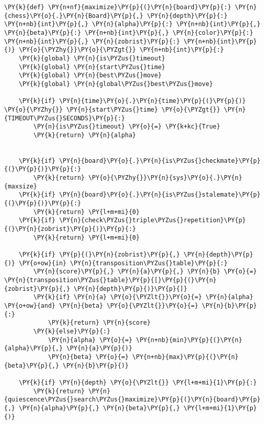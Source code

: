     \begin{tcolorbox}[fontupper=\linespread{.66}\selectfont, breakable, size=fbox, boxrule=1pt, pad at break*=1mm,colback=cellbackground, colframe=cellborder]
\begin{Verbatim}[commandchars=\\\{\}]
\PY{k}{def} \PY{n+nf}{maximize}\PY{p}{(}\PY{n}{board}\PY{p}{:} \PY{n}{chess}\PY{o}{.}\PY{n}{Board}\PY{p}{,} \PY{n}{depth}\PY{p}{:} \PY{n+nb}{int}\PY{p}{,} \PY{n}{alpha}\PY{p}{:} \PY{n+nb}{int}\PY{p}{,} \PY{n}{beta}\PY{p}{:} \PY{n+nb}{int}\PY{p}{,} \PY{n}{color}\PY{p}{:} \PY{n+nb}{int}\PY{p}{,} \PY{n}{zobrist}\PY{p}{:} \PY{n+nb}{int}\PY{p}{)} \PY{o}{\PYZhy{}}\PY{o}{\PYZgt{}} \PY{n+nb}{int}\PY{p}{:}
    \PY{k}{global} \PY{n}{is\PYZus{}timeout}
    \PY{k}{global} \PY{n}{start\PYZus{}time}
    \PY{k}{global} \PY{n}{best\PYZus{}move}
    \PY{k}{global} \PY{n}{global\PYZus{}best\PYZus{}move}

    \PY{k}{if} \PY{n}{time}\PY{o}{.}\PY{n}{time}\PY{p}{(}\PY{p}{)} \PY{o}{\PYZhy{}} \PY{n}{start\PYZus{}time} \PY{o}{\PYZgt{}} \PY{n}{TIMEOUT\PYZus{}SECONDS}\PY{p}{:}
        \PY{n}{is\PYZus{}timeout} \PY{o}{=} \PY{k+kc}{True}
        \PY{k}{return} \PY{n}{alpha}
    
    
    \PY{k}{if} \PY{n}{board}\PY{o}{.}\PY{n}{is\PYZus{}checkmate}\PY{p}{(}\PY{p}{)}\PY{p}{:}
        \PY{k}{return} \PY{o}{\PYZhy{}}\PY{n}{sys}\PY{o}{.}\PY{n}{maxsize}
    \PY{k}{if} \PY{n}{board}\PY{o}{.}\PY{n}{is\PYZus{}stalemate}\PY{p}{(}\PY{p}{)}\PY{p}{:}
        \PY{k}{return} \PY{l+m+mi}{0}
    \PY{k}{if} \PY{n}{check\PYZus{}triple\PYZus{}repetition}\PY{p}{(}\PY{n}{zobrist}\PY{p}{)}\PY{p}{:}
        \PY{k}{return} \PY{l+m+mi}{0}

    \PY{k}{if} \PY{p}{(}\PY{n}{zobrist}\PY{p}{,} \PY{n}{depth}\PY{p}{)} \PY{o+ow}{in} \PY{n}{transposition\PYZus{}table}\PY{p}{:}
        \PY{n}{score}\PY{p}{,} \PY{n}{a}\PY{p}{,} \PY{n}{b} \PY{o}{=} \PY{n}{transposition\PYZus{}table}\PY{p}{[}\PY{p}{(}\PY{n}{zobrist}\PY{p}{,} \PY{n}{depth}\PY{p}{)}\PY{p}{]}
        \PY{k}{if} \PY{n}{a} \PY{o}{\PYZlt{}}\PY{o}{=} \PY{n}{alpha} \PY{o+ow}{and} \PY{n}{beta} \PY{o}{\PYZlt{}}\PY{o}{=} \PY{n}{b}\PY{p}{:}
            \PY{k}{return} \PY{n}{score}
        \PY{k}{else}\PY{p}{:}
            \PY{n}{alpha} \PY{o}{=} \PY{n+nb}{min}\PY{p}{(}\PY{n}{alpha}\PY{p}{,} \PY{n}{a}\PY{p}{)}
            \PY{n}{beta} \PY{o}{=} \PY{n+nb}{max}\PY{p}{(}\PY{n}{beta}\PY{p}{,} \PY{n}{b}\PY{p}{)}

    \PY{k}{if} \PY{n}{depth} \PY{o}{\PYZlt{}} \PY{l+m+mi}{1}\PY{p}{:}
        \PY{k}{return} \PY{n}{quiescence\PYZus{}search\PYZus{}maximize}\PY{p}{(}\PY{n}{board}\PY{p}{,} \PY{n}{alpha}\PY{p}{,} \PY{n}{beta}\PY{p}{,} \PY{l+m+mi}{1}\PY{p}{)}


\end{Verbatim}
\end{tcolorbox}
